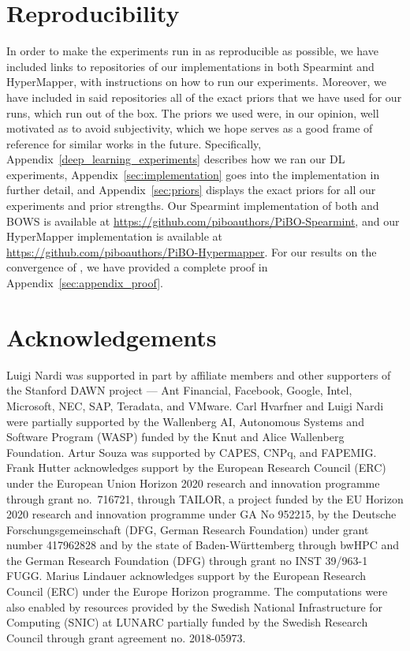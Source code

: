 \documentclass{article}
\newcommand{\method}[0]{\text{${\pi}$BO}\xspace}
\begin{document}
\section{Reproducibility}
In order to make the experiments run in \method{} as reproducible as possible, we have included links to repositories of our implementations in both Spearmint and HyperMapper, with instructions on how to run our experiments. Moreover, we have included in said repositories all of the exact priors that we have used for our runs, which run out of the box. The priors we used were, in our opinion, well motivated as to avoid subjectivity, which we hope serves as a good frame of reference for similar works in the future. Specifically, Appendix~\ref{deep_learning_experiments} describes how we ran our DL experiments, Appendix~\ref{sec:implementation} goes into the implementation in further detail, and Appendix~\ref{sec:priors} displays the exact priors for all our experiments and prior strengths. Our Spearmint implementation of both \method{} and BOWS is available at \url{https://github.com/piboauthors/PiBO-Spearmint}, and our HyperMapper implementation is available at \url{https://github.com/piboauthors/PiBO-Hypermapper}. For our results on the convergence of \method, we have provided a complete proof in Appendix~\ref{sec:appendix_proof}.

\section{Acknowledgements}
Luigi Nardi was supported in part by affiliate members and other supporters of the Stanford DAWN project — Ant Financial, Facebook, Google, Intel, Microsoft, NEC, SAP, Teradata, and VMware. Carl Hvarfner and Luigi Nardi were partially supported by the Wallenberg AI, Autonomous Systems and Software Program (WASP) funded by the Knut and Alice Wallenberg Foundation. Artur Souza was supported by CAPES, CNPq, and FAPEMIG. Frank Hutter acknowledges support by the European Research Council (ERC) under the European Union Horizon 2020 research and innovation programme through grant no.\ 716721, through TAILOR, a project funded by the EU Horizon 2020 research and innovation programme under GA No 952215, by the Deutsche Forschungsgemeinschaft (DFG, German Research Foundation) under grant number 417962828 and by the state of Baden-W\"{u}rttemberg through bwHPC and the German Research Foundation (DFG) through grant no INST 39/963-1 FUGG. Marius Lindauer acknowledges support by the European Research Council (ERC) under the Europe Horizon programme. The computations were also enabled by resources provided by the Swedish National Infrastructure for Computing (SNIC) at LUNARC partially funded by the Swedish Research Council through grant agreement no. 2018-05973.



\appendix

\end{document}
